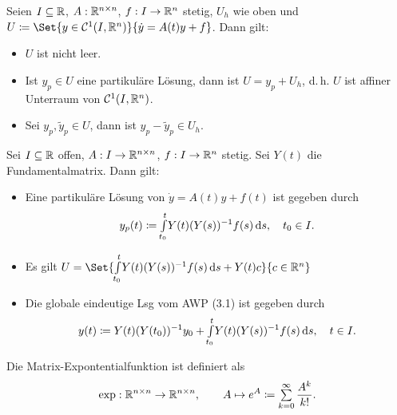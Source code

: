 \documentclass{cheat-sheet}
\begin{document}
\begin{satz}%
  Seien $I \subseteq \mathbb{R}$, $A : \mathbb{R}^{n \times n}$, $f : I \to \mathbb{R}^n$ stetig, $U_h$ wie oben und $U \coloneqq \Set{ y \in \mathcal{C}^1(I, \R^n) }{ \dot{y} = A(t) y + f }$. Dann gilt:
  \begin{itemize}
    \item $U$ ist nicht leer.
    \item Ist $y_p \in U$ eine partikuläre Lösung, dann ist $U = y_p + U_h$, d.\,h. $U$ ist affiner Unterraum von $\mathcal{C}^1(I, \mathbb{R}^n)$.
    \item Sei $y_p, \tilde{y}_p \in U$, dann ist $y_p - \tilde{y}_p \in U_h$.
  \end{itemize}
\end{satz}

\begin{satz}
  Sei $I \subseteq \mathbb{R}$ offen, $A : I \to \mathbb{R}^{n \times n}$, $f : I \to \mathbb{R}^n$ stetig. Sei $Y(t)$ die Fundamentalmatrix. Dann gilt:
  \begin{itemize}
    \item Eine partikuläre Lösung von $\dot{y} = A(t) y + f(t)$ ist gegeben durch
    \[ y_p(t) \coloneqq {\textstyle \int\limits_{t_0}^{t}} Y(t) (Y(s))^{-1} f(s) \,\mathrm{d} s, \quad t_0 \in I. \]
    \item Es gilt $U = \Set{ \Int{t_0}{t}{Y(t) (Y(s))^{-1} f(s)}{s} + Y(t) c }{ c \in \R^n }$
    \item Die globale eindeutige Lsg vom AWP (3.1) ist gegeben durch
    \[ y(t) \coloneqq Y(t) (Y(t_0))^{-1} y_0 + {\textstyle \int\limits_{t_0}^{t}} Y(t) (Y(s))^{-1} f(s) \,\mathrm{d} s, \quad t \in I. \]
  \end{itemize}
\end{satz}


\begin{defn}
  Die Matrix-Expontentialfunktion ist definiert als
  \[ \exp : \R^{n \times n} \to \R^{n \times n}, \qquad A \mapsto e^A \coloneqq \sum_{k=0}^\infty \frac{A^k}{k!}. \]
\end{defn}
\end{document}
